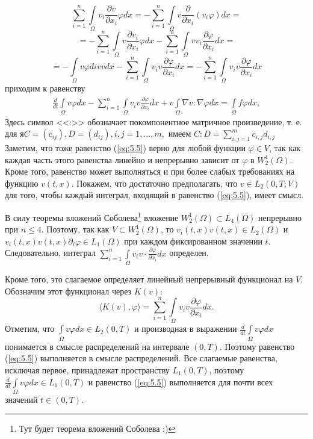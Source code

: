 $$\sum_{i=1}^{n}\int\limits_\Omega v_i\frac{\partial v}{\partial x_i}\varphi dx=-\sum_{i=1}^{n}\int\limits_\Omega v\frac{\partial}{\partial x_i}(v_i\varphi)dx=$$
$$=-\sum_{i=1}^{n}\int\limits_\Omega v\frac{\partial v_i}{\partial x_i}\varphi dx-\sum_{i=1}^{n}\int\limits_\Omega vv_i\frac{\partial\varphi}{\partial x_i} dx=$$
$$=-\int\limits_\Omega v\varphi div v dx-\sum_{i=1}^{n}\int\limits_\Omega v_i v\frac{\partial\varphi}{\partial x_i}dx=
-\sum_{i=1}^{n}\int\limits_\Omega v_i v\frac{\partial\varphi}{\partial x_i}dx$$
приходим к равенству
\begin{equation}\label{eq:5.5}
    \begin{gathered}
        \frac{d}{dt}\int\limits_\Omega v \varphi dx-\sum_{i=1}^{n}\int\limits_\Omega v_i v
        \frac{\partial \varphi }{\partial x_i}dx + v\int\limits_\Omega \nabla v :\nabla\varphi dx
        =\int\limits_\Omega f\varphi dx,
    \end{gathered}
\end{equation}
Здесь символ <<:>> обозначает покомпонентное матричное произведение, т. е. для $я C=(c_{ij}), D=(d_{ij}), i, j=1,...,m,$ имеем $C:D=\sum_{i, j=1}^{m} c_{i, j}d_{i, j}$
Заметим, что тоже равенство (\ref{eq:5.5}) верно для любой функции $\varphi\in V$, так как каждая часть этого равенства линейно и непрерывно зависит от
$\varphi$ в $W^{1}_{2}(\Omega)$. Кроме того, равенство может выполняться и при более слабых требованиях на функцию $v(t, x)$.
Покажем, что достаточно предполагать, что $v\in L_2(0, T;V)$ для того, чтобы каждый интеграл, входящий в равенство (\ref{eq:5.5}), имеет смысл.

В силу теоремы вложений Соболева\footnote{Тут будет теорема вложений Соболева :)} вложение $W^{1}_{2}(\Omega)\subset L_4(\Omega)$ непрерывно при $n \leqslant 4$.
Поэтому, так как $V\subset W^{1}_{2}(\Omega)$, то $v_i(t, x)v(t, x)\in L_2(\Omega)$ и $v_i(t, x)v(t, x)\partial_i\varphi \in L_1(\Omega)$
при каждом фиксированном значении $t$. Следовательно, интеграл $\sum_{i=1}^{n}\int\limits_\Omega v_iv\cdot\frac{\partial\varphi}{\partial x_i}dx$ определен.

Кроме того, это слагаемое определяет линейный непрерывный функционал на $V$. Обозначим этот функционал через $K(v)$:
$$\langle K(v),\varphi \rangle = \sum_{i=1}^{n}\int\limits_\Omega v_i v \frac{\partial \varphi}{\partial x_i}dx.$$
Отметим, что $\int\limits_\Omega v \varphi dx\in L_2(0, T)$ и производная в выражении \linebreak
$\frac{d}{dt}\int\limits_\Omega v \varphi dx$
понимается в смысле распределений на интервале $(0, T)$. Поэтому равенство (\ref{eq:5.5}) выполняется в смысле распределений.
Все слагаемые равенства, исключая первое, принадлежат пространству $L_1(0, T)$, поэтому $\frac{d}{dt}\int\limits_\Omega v \varphi dx\in L_1(0, T)$
и равенство (\ref{eq:5.5}) выполняется для почти всех значений $t\in (0, T)$.

